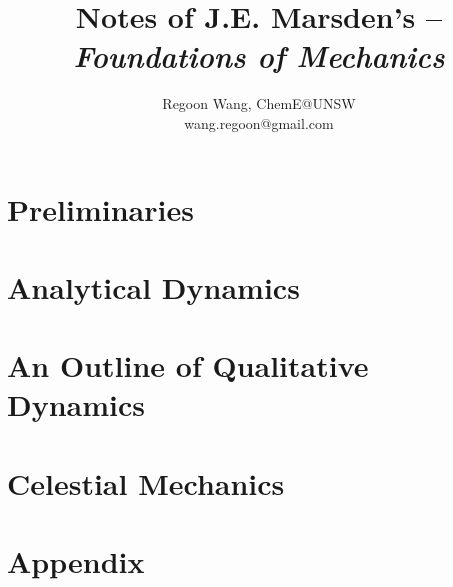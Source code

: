 \documentclass[12pt]{report}
\begin{document}
 
\title{\textbf{Notes of J.E. Marsden's -- \textit{Foundations of Mechanics}}}
\author{Regoon Wang, ChemE@UNSW \\ wang.regoon@gmail.com} 
 
\maketitle

\tableofcontents
\part{Preliminaries}
 

\part{Analytical Dynamics}
 
 

\part{An Outline of Qualitative Dynamics} 
 
 

\part{Celestial Mechanics}
 
 
\part*{Appendix}
 
 
\end{document}
